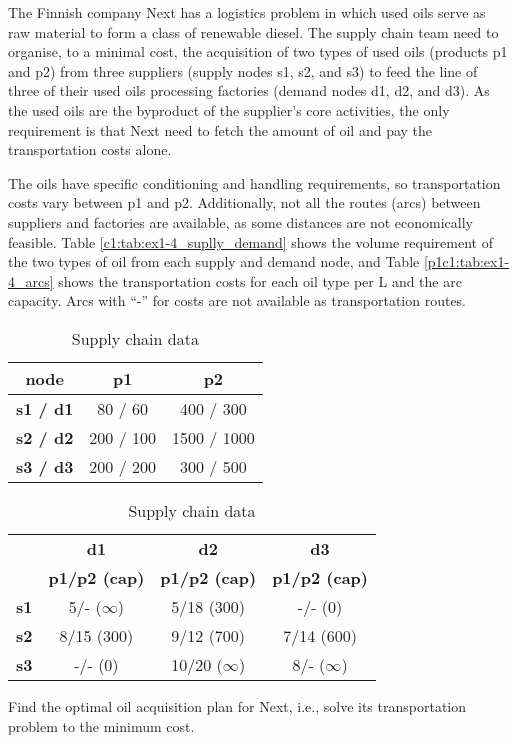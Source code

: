 The Finnish company Next has a logistics problem in which used oils serve as raw material to form a class of renewable diesel. The supply chain team need to organise, to a minimal cost, the acquisition of two types of used oils (products p1 and p2) from three suppliers (supply nodes s1, s2, and s3) to feed the line of three of their used oils processing factories (demand nodes d1, d2, and d3). As the used oils are the byproduct of the supplier's core activities, the only requirement is that Next need to fetch the amount of oil and pay the transportation costs alone.

The oils have specific conditioning and handling requirements, so transportation costs vary between p1 and p2. Additionally, not all the routes (arcs) between suppliers and factories are available, as some distances are not economically feasible. Table \ref{c1:tab:ex1-4_suplly_demand} shows the volume requirement of the two types of oil from each supply and demand node, and Table \ref{p1c1:tab:ex1-4_arcs} shows the transportation costs for each oil type per L and the arc capacity. Arcs with ``-'' for costs are not available as transportation routes.

\begin{table}[H]
	\begin{subtable}[h]{0.4\textwidth}
		\begin{center}
		\begin{tabular}{c|cc}
			\textbf{node} & \textbf{p1} & \textbf{p2} \\
			\hline
			\textbf{s1 / d1} & 80 / 60 & 400 / 300 \\
			\textbf{s2 / d2} & 200 / 100 & 1500 / 1000 \\
			\textbf{s3 / d3} & 200 / 200 & 300 / 500 \\
		\end{tabular}
		\end{center}
		\caption{Supply availability and demand per oil type [in L]}
		\label{c1:tab:ex1-4_suplly_demand}
	\end{subtable}
	\hfill
	\begin{subtable}[H]{0.55\textwidth}
		\begin{center}
			\begin{tabular}{c|ccc}
				 & \textbf{d1} & \textbf{d2} & \textbf{d3}\\
				 & \textbf{p1/p2 (cap)} & \textbf{p1/p2 (cap)} & \textbf{p1/p2 (cap)}\\
				\hline
				\textbf{s1} & 5/- ($\infty$) & 5/18 (300) & -/- (0)\\
				\textbf{s2} & 8/15 (300) & 9/12 (700) & 7/14 (600)\\
				\textbf{s3} & -/- (0) & 10/20 ($\infty$) & 8/- ($\infty$)\\
			\end{tabular}
		\end{center}
		\caption{Arcs costs per oil type [in \euro \ per L] and arc capacities [in L]}
		\label{c1:tab:ex1-4_arcs}
	\end{subtable}
	\caption{Supply chain data}
\end{table}

Find the optimal oil acquisition plan for Next, i.e., solve its transportation problem to the minimum cost.
